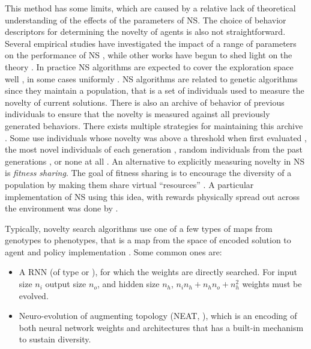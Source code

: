 This method has some limits, which are caused by a relative lack of theoretical
understanding of the effects of the parameters of \ac{NS}. The choice of
behavior descriptors for determining the novelty of agents is also not
straightforward. Several empirical studies have investigated the impact of a
range of parameters on the performance of \ac{NS}
\parencite{gomesDevisingEffectiveNovelty2015,
  kistemakerCriticalFactorsPerformance2011}, while other works have begun to
shed light on the theory \parencite{doncieuxNoveltySearchTheoretical2019}. In
practice \ac{NS} algorithms are expected to cover the exploration space well
\parencite{cullyQualityDiversityOptimization2017,pughQualityDiversityNew2016},
in some cases uniformly \parencite{gomesDevisingEffectiveNovelty2015}. \ac{NS}
algorithms are related to genetic algorithms since they maintain a population,
that is a set of individuals used to measure the novelty of current solutions.
There is also an archive of behavior of previous individuals to ensure that the
novelty is measured against all previously generated behaviors. There exists
multiple strategies for maintaining this archive
\parencite{gomesDevisingEffectiveNovelty2015}. Some use individuals whose
novelty was above a threshold when first evaluated
\parencite{lehmanAbandoningObjectivesEvolution2011}, the most novel individuals
of each generation \parencite{liapisConstrainedNoveltySearch2015}, random
individuals from the past generations
\parencite{lehmanEfficientlyEvolvingPrograms2010}, or none at all
\parencite{mouretEncouragingBehavioralDiversity2012}. An alternative to
explicitly measuring novelty in \ac{NS} is \emph{fitness sharing}. The goal of
fitness sharing is to encourage the diversity of a population by making them
share virtual ``resources'' \parencite{goldbergSimpleGeneticAlgorithms1987,
  hollandAdaptationNaturalArtificial1992}. A particular implementation of
\ac{NS} using this idea, with rewards physically spread out across the
environment was done by \textcite{herelEmergenceNoveltyEvolutionary2022}.

Typically, novelty search algorithms use one of a few types of maps from
genotypes to phenotypes, that is a map from the space of encoded solution to
agent and policy implementation
\parencite{mouretEncouragingBehavioralDiversity2012}. Some common ones are:

\begin{itemize}
  \item A \ac{RNN} (of type \cite{elmanFindingStructureTime1990} or
        \cite{jordanSerialOrderParallel1997}), for which the weights are
        directly searched. For input size $n_{i}$ output size $n_{o}$, and
        hidden size $n_{h}$, $n_{i}n_{h} + n_{h}n_{o} + n_{h}^{2}$ weights must
        be evolved.
  \item Neuro-evolution of augmenting topology (NEAT,
        \cite{stanleyEvolvingNeuralNetworks2002}), which is an encoding of both
        neural network weights and architectures that has a built-in mechanism
        to sustain diversity.
\end{itemize}


